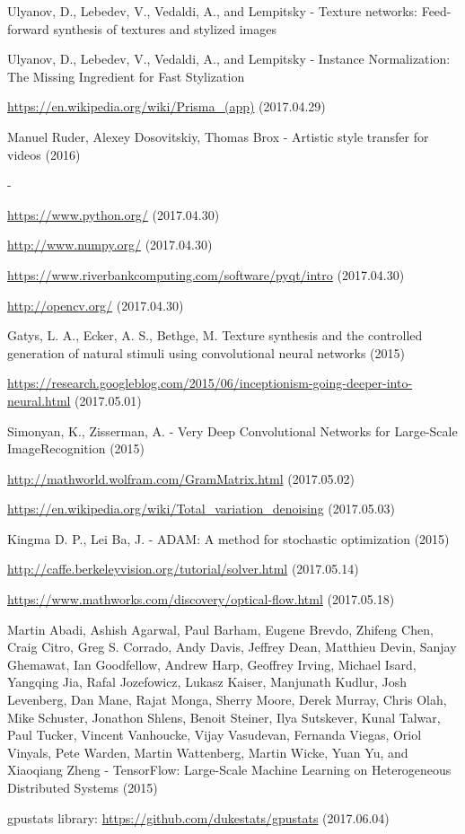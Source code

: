 \documentclass[12pt, a4paper, oneside]{book}
\theoremstyle{tetel}
\begin{document}
\begin{thebibliography}{1}
Ulyanov, D., Lebedev, V., Vedaldi, A., and Lempitsky - Texture networks: Feed-forward synthesis of textures and stylized images

Ulyanov, D., Lebedev, V., Vedaldi, A., and Lempitsky - Instance Normalization: The Missing Ingredient for Fast Stylization

\url{https://en.wikipedia.org/wiki/Prisma_(app)} (2017.04.29)

Manuel Ruder, Alexey Dosovitskiy, Thomas Brox - Artistic style transfer for videos (2016)

-

\url{https://www.python.org/} (2017.04.30)

\url{http://www.numpy.org/} (2017.04.30)

\url{https://www.riverbankcomputing.com/software/pyqt/intro} (2017.04.30)

\url{http://opencv.org/} (2017.04.30)

Gatys, L. A., Ecker, A. S., Bethge, M. Texture synthesis and the controlled generation of natural stimuli using convolutional neural networks (2015)

\url{https://research.googleblog.com/2015/06/inceptionism-going-deeper-into-neural.html} (2017.05.01)

Simonyan, K., Zisserman, A. - Very Deep Convolutional Networks for Large-Scale ImageRecognition (2015)

\url{http://mathworld.wolfram.com/GramMatrix.html} (2017.05.02)

\url{https://en.wikipedia.org/wiki/Total_variation_denoising} (2017.05.03)

Kingma D. P., Lei Ba, J. - ADAM: A method for stochastic optimization (2015)

\url{http://caffe.berkeleyvision.org/tutorial/solver.html} (2017.05.14)

\url{https://www.mathworks.com/discovery/optical-flow.html} (2017.05.18)

Martin Abadi, Ashish Agarwal, Paul Barham, Eugene Brevdo, Zhifeng Chen, Craig Citro, Greg S. Corrado, Andy Davis, Jeffrey Dean, Matthieu Devin, Sanjay Ghemawat, Ian Goodfellow, Andrew Harp, Geoffrey Irving, Michael Isard, Yangqing Jia, Rafal Jozefowicz, Lukasz Kaiser, Manjunath Kudlur, Josh Levenberg, Dan Mane, Rajat Monga, Sherry Moore, Derek Murray, Chris Olah, Mike Schuster, Jonathon Shlens, Benoit Steiner, Ilya Sutskever, Kunal Talwar, Paul Tucker, Vincent Vanhoucke, Vijay Vasudevan, Fernanda Viegas, Oriol Vinyals, Pete Warden, Martin Wattenberg, Martin Wicke, Yuan Yu, and Xiaoqiang Zheng - TensorFlow: Large-Scale Machine Learning on Heterogeneous Distributed Systems (2015)

gpustats library: \url{https://github.com/dukestats/gpustats} (2017.06.04)


\end{thebibliography}
\end{document}
